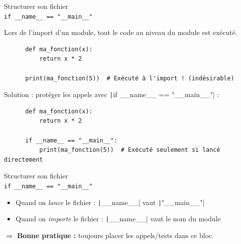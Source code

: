 \documentclass[10pt]{beamer}
\begin{document}
\begin{frame}[fragile]{Structurer son fichier \\ \texttt{if \_\_name\_\_ == "\_\_main\_\_"}}

  Lors de l'import d'un module, \alert{tout le code au niveau du module est exécuté}.

  \begin{beamercodeblock}
    \begin{verbatim}
      def ma_fonction(x):
          return x * 2

      print(ma_fonction(5))  # Exécuté à l'import ! (indésirable)
    \end{verbatim}
  \end{beamercodeblock}

  \pause

  Solution : protéger les appels avec \texttt|if __name__ == "__main__"| :

  \begin{beamercodeblock}
    \begin{verbatim}
      def ma_fonction(x):
          return x * 2

      if __name__ == "__main__":
          print(ma_fonction(5))  # Exécuté seulement si lancé directement
    \end{verbatim}
  \end{beamercodeblock}

\end{frame}


\begin{frame}[fragile]{Structurer son fichier \\ \texttt{if \_\_name\_\_ == "\_\_main\_\_"}}

  \begin{itemize}
    \item Quand on \emph{lance} le fichier : \texttt|__name__| vaut \texttt|"__main__"|
    \item Quand on \emph{importe} le fichier : \texttt|__name__| vaut le nom du module
  \end{itemize}

  $\Rightarrow$ \textbf{Bonne pratique :} toujours placer les appels/tests dans ce bloc.

\end{frame}
\end{document}
